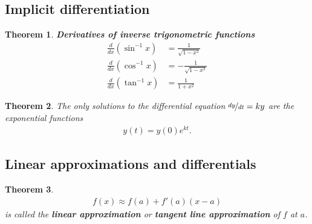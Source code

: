 \documentclass{article}
\theoremstyle{sltheorem}
\newtheorem{theorem}{Theorem}[section]
\begin{document}
\subsection{Implicit differentiation}
\begin{theorem}
    \textbf{Derivatives of inverse trigonometric functions}\\
    \begin{align*}
        \frac{d}{dx}(\sin^{-1}x)&=\frac{1}{\sqrt{1-x^2}}\\
        \frac{d}{dx}(\cos^{-1}x)&=-\frac{1}{\sqrt{1-x^2}}\\
        \frac{d}{dx}(\tan^{-1}x)&=\frac{1}{1+x^2}
    \end{align*}
\end{theorem}
\begin{theorem}
    The only solutions to the differential equation $\nicefrac{dy}{dt}=ky$ are the exponential functions
    \begin{align*}
        y(t)=y(0)e^{kt}.
    \end{align*}
\end{theorem}
\setcounter{subsection}{9}
\subsection{Linear approximations and differentials}
\begin{theorem}
    \begin{align*}
        f(x)\approx f(a)+f'(a)(x-a)
    \end{align*}
    is called the \textbf{linear approximation} or \textbf{tangent line approximation} of $f$ at $a$.
\end{theorem}
\end{document}
